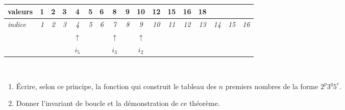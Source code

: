 \begin{tabular}{|l|c|c|c|c|c|c|c|c|c|c|c|c|c|c|c|c|}
 \hline
 valeurs&\bf 1&\bf 2&\bf 3&\bf 4&\bf 5&\bf 6&\bf 8&\bf 9&\bf 10&\bf
12&\bf 15&\bf 16&\bf 18&&&\\ \hline
 \it indice&\it 1&\it 2&\it 3&\it 4&\it 5&\it 6&\it
7&\it 8&\it 9&\it 10&\it 11&\it 12&\it 13&\it 14&\it 15&\it 16\rm\\ 
 \hline
\multicolumn{1}{c}{} &\multicolumn{1}{c}{}
&\multicolumn{1}{c}{} &\multicolumn{1}{c}{}
&\multicolumn{1}{c}{$\uparrow$}&\multicolumn{1}{c}{}
&\multicolumn{1}{c}{} &\multicolumn{1}{c}{$\uparrow$}&\multicolumn{1}{c}{}
&\multicolumn{1}{c}{$\uparrow$}&\multicolumn{1}{c}{} &\multicolumn{1}{c}{}
&\multicolumn{1}{c}{} &\multicolumn{1}{c}{} &\multicolumn{1}{c}{}
&\multicolumn{1}{c}{} &\multicolumn{1}{c}{} \\
 \multicolumn{1}{c}{} &\multicolumn{1}{c}{} &\multicolumn{1}{c}{}
&\multicolumn{1}{c}{} &\multicolumn{1}{c}{$i_5$}&\multicolumn{1}{c}{}
&\multicolumn{1}{c}{} &\multicolumn{1}{c}{$i_3$}&\multicolumn{1}{c}{}
&\multicolumn{1}{c}{$i_2$}&\multicolumn{1}{c}{} &\multicolumn{1}{c}{}
&\multicolumn{1}{c}{} &\multicolumn{1}{c}{} &\multicolumn{1}{c}{}
&\multicolumn{1}{c}{} &\multicolumn{1}{c}{} 
 \end{tabular}
\\



\begin{enumerate}
\item Écrire, selon ce principe, la fonction qui construit le tableau des $n$
premiers nombres de la forme $2^p3^q5^r$.
\item Donner l'invariant de boucle et la démonstration de ce théorème.
\end{enumerate}